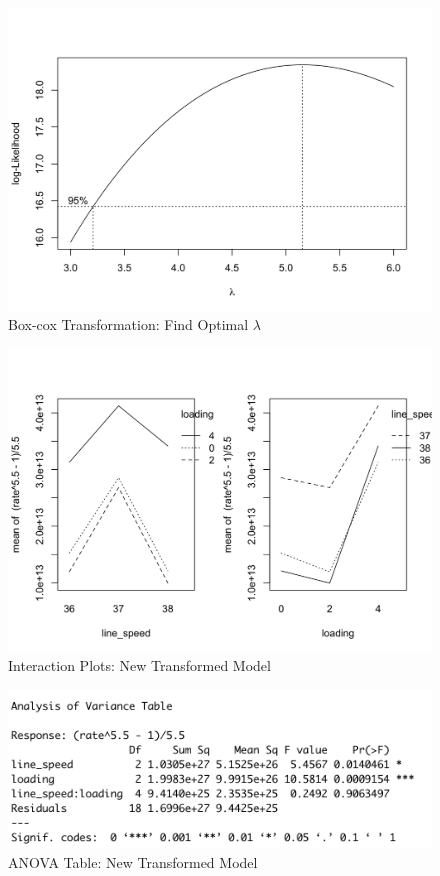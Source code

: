 \documentclass[11pt,a4paper]{article}
\begin{document}
\begin{figure}[htb]
    \centering
    \includegraphics[scale=0.3]{lam.png}
    \caption{Box-cox Transformation: Find Optimal $\lambda$}
    \label{}
\end{figure}

\begin{figure}[htb]
    \centering
    \includegraphics[scale=0.3]{inter3.png}
    \caption{Interaction Plots: New Transformed Model}
    \label{}
\end{figure}
\begin{figure}[htb]
    \centering
    \includegraphics[scale=0.8]{inter4.png}
    \caption{ANOVA Table: New Transformed Model}
    \label{}
\end{figure}
\end{document}
